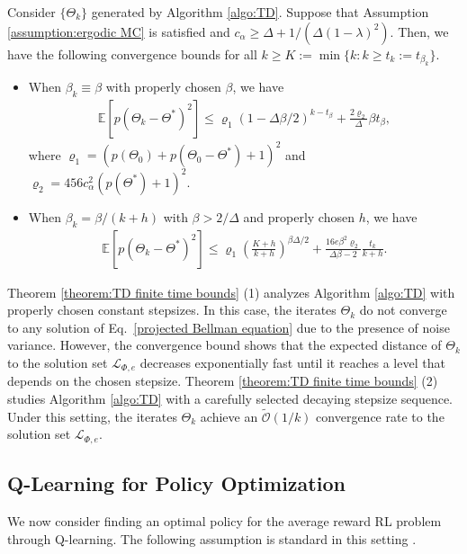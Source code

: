 \documentclass[11 pt]{article}
\begin{document}
	\begin{theorem}
		\label{theorem:TD finite time bounds}
		Consider $\{\Theta_k\}$ generated by Algorithm \ref{algo:TD}. Suppose that Assumption \ref{assumption:ergodic MC} is satisfied and $c_\alpha\geq \Delta+1/(\Delta(1-\lambda)^2)$. Then, we have the following convergence bounds for all $k \geq K:=\min\{k:k\geq t_k:=t_{\beta_k}\}$.
		\begin{itemize}[(1)]
			\item When $\beta_k \equiv \beta$ with properly chosen $\beta$, we have
			\begin{align*}
				\mathbb{E}[p(\Theta_{k}-\Theta^*)^2] \leq  \varrho_1 (1 - \Delta\beta/2)^{k-t_\beta} + \frac{2\varrho_2}{\Delta}\beta t_\beta,
			\end{align*}
			where $\varrho_1=(p(\Theta_0)+p(\Theta_0-\Theta^*)+1)^2$ and $\varrho_2=456c_\alpha^2( p(\Theta^*)+1)^2$.
			\item When $\beta_k = \beta/(k+h)$ with $\beta>2/\Delta$ and properly chosen $h$, we have
			\begin{align*}
				\mathbb{E}[p(\Theta_{k}-\Theta^*)^2] \leq  \varrho_1 \left(\frac{K+h}{k + h}\right)^{\beta \Delta/2} + \frac{16e\beta^2\varrho_2}{\Delta\beta - 2} \frac{t_k}{k + h}.
			\end{align*}
		\end{itemize}
	\end{theorem}
	
	Theorem \ref{theorem:TD finite time bounds} (1) analyzes Algorithm \ref{algo:TD} with properly chosen constant stepsizes. In this case, the iterates $\Theta_k$ do not converge to any solution of Eq.~\eqref{projected Bellman equation} due to the presence of noise variance. However, the convergence bound shows that the expected distance of $\Theta_k$ to the solution set $\mathcal{L}_{\Phi, e}$ decreases exponentially fast until it reaches a level that depends on the chosen stepsize. Theorem \ref{theorem:TD finite time bounds} (2) studies Algorithm \ref{algo:TD} with a carefully selected decaying stepsize sequence. Under this setting, the iterates $\Theta_k$ achieve an $\tilde{\mathcal{O}}\left(1 / k\right)$ convergence rate to the solution set $\mathcal{L}_{\Phi, e}$.
	
	
	
	\subsection{Q-Learning for Policy Optimization}
	We now consider finding an optimal policy for the average reward RL problem through Q-learning. The following assumption is standard in this setting \cite[Section 8.4]{puterman2014markov}.
	
\end{document}
